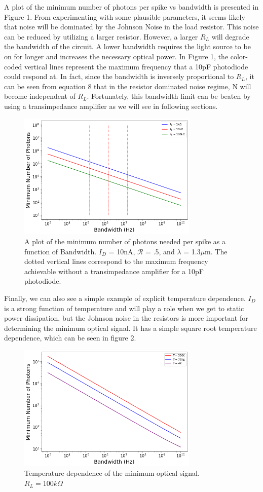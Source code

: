 \documentclass[twocolumn]{article}
\begin{document}
A plot of the minimum number of photons per spike vs bandwidth is presented in Figure 1. From experimenting with some plausible parameters, it seems likely that noise will be dominated by the Johnson Noise in the load resistor. This noise can be reduced by utilizing a larger resistor. However, a larger $R_L$ will degrade the bandwidth of the circuit. A lower bandwidth requires the light source to be on for longer and increases the necessary optical power. In Figure 1, the color-coded vertical lines represent the maximum frequency that a 10pF photodiode could respond at. In fact, since the bandwidth is inversely proportional to $R_L$, it can be seen from equation 8 that in the resistor dominated noise regime, N will become independent of $R_L$. Fortunately, this bandwidth limit can be beaten by using a transimpedance amplifier as we will see in following sections.
\begin{figure}
    \centering
    \includegraphics[width=8.6cm]{photon_V_BW.png}
    \caption{A plot of the minimum number of photons needed per spike as a function of Bandwidth. $I_D$ = 10nA, $\mathcal{R}$ = .5, and $\lambda$ = 1.3$\mu$m. The dotted vertical lines correspond to the maximum frequency achievable without a transimpedance amplifier for a 10pF photodiode. }
    \label{fig:my_label}
\end{figure}

Finally, we can also see a simple example of explicit temperature dependence. $I_D$ is a strong function of temperature and will play a role when we get to static power dissipation, but the Johnson noise in the resistors is more important for determining the minimum optical signal. It has a simple square root temperature dependence, which can be seen in figure 2.
\begin{figure}
    \centering
    \includegraphics[width=8.6cm]{Temp_Photon_spike.png}
    \caption{Temperature dependence of the minimum optical signal. $R_L = 100k\Omega$}
    \label{fig:my_label}
\end{figure}
\end{document}
